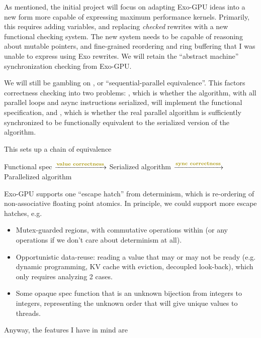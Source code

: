 
As mentioned, the initial project will focus on adapting Exo-GPU ideas into a new form more capable of expressing maximum performance kernels.
Primarily, this requires adding  variables, and replacing \emph{checked} rewrites with a new functional checking system.
The new system needs to be capable of reasoning about mutable pointers, and fine-grained reordering and ring buffering that I was unable to express using Exo rewrites.
We will retain the ``abstract machine'' synchronization checking from Exo-GPU.

We will still be gambling on , or ``sequential-parallel equivalence''.
This factors correctness checking into two problems: , which is whether the algorithm, with all parallel loops and async instructions serialized, will implement the functional specification, and , which is whether the real parallel algorithm is sufficiently synchronized to be functionally equivalent to the serialized version of the algorithm.

This sets up a chain of equivalence

\begin{center}
    Functional spec $\xrightarrow{\text{\myKeyA{value correctness}}}$
    Serialized algorithm $\xrightarrow{\text{\myKeyA{sync correctness}}}$
    Parallelized algorithm
\end{center}

Exo-GPU supports one ``escape hatch'' from determinism, which is re-ordering of non-associative floating point atomics.
In principle, we could support more escape hatches, e.g.
\begin{itemize}
  \item Mutex-guarded regions, with commutative operations within (or any operations if we don't care about determinism at all).
  \item Opportunistic data-reuse: reading a value that may or may not be ready (e.g. dynamic programming, KV cache with eviction, decoupled look-back), which only requires analyzing 2 cases.
  \item Some opaque spec function  that is an unknown bijection from integers to integers, representing the unknown order that  will give unique values to threads.
\end{itemize}

Anyway, the features I have in mind are

